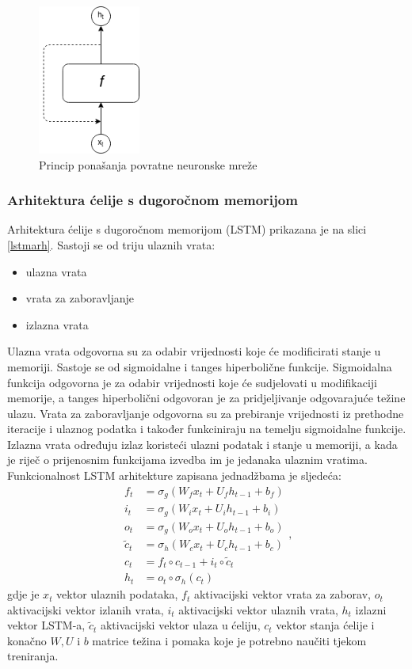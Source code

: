 \documentclass[times, utf8, zavrsni]{fer}
\begin{document}
\begin{figure}
	\centering
	\includegraphics[width=0.3\textwidth]{rnn}
	\caption{Princip ponašanja povratne neuronske mreže}
	\label{rnnprincip}
\end{figure}

\subsubsection{Arhitektura ćelije s dugoročnom memorijom}
Arhitektura ćelije s dugoročnom memorijom (\gls{LSTM}) prikazana je na slici \ref{lstmarh}. Sastoji se od triju ulaznih vrata:
\begin{itemize}
	\item ulazna vrata
	\item vrata za zaboravljanje
	\item izlazna vrata
\end{itemize}

Ulazna vrata odgovorna su za odabir vrijednosti koje će modificirati stanje u memoriji. Sastoje se od sigmoidalne i tanges hiperbolične funkcije. Sigmoidalna funkcija odgovorna je za odabir vrijednosti koje će sudjelovati u modifikaciji memorije, a tanges hiperbolični odgovoran je za pridjeljivanje odgovarajuće težine ulazu. Vrata za zaboravljanje odgovorna su za prebiranje vrijednosti iz prethodne iteracije i ulaznog podatka i također funkciniraju na temelju sigmoidalne funkcije. Izlazna vrata određuju izlaz koristeći ulazni podatak i stanje u memoriji, a kada je riječ o prijenosnim funkcijama izvedba im je jedanaka ulaznim vratima. Funkcionalnost \gls{LSTM} arhitekture zapisana jednadžbama je sljedeća: \[ \begin{aligned}
f_{t} &=\sigma_{g}\left(W_{f} x_{t}+U_{f} h_{t-1}+b_{f}\right) \\
i_{t} &=\sigma_{g}\left(W_{i} x_{t}+U_{i} h_{t-1}+b_{i}\right) \\
o_{t} &=\sigma_{g}\left(W_{o} x_{t}+U_{o} h_{t-1}+b_{o}\right) \\
\tilde{c}_{t} &=\sigma_{h}\left(W_{c} x_{t}+U_{c} h_{t-1}+b_{c}\right) \\
c_{t} &=f_{t} \circ c_{t-1}+i_{t} \circ \tilde{c}_{t} \\
h_{t} &=o_{t} \circ \sigma_{h}\left(c_{t}\right)
\end{aligned}, \]
gdje je $x_t$ vektor ulaznih podataka, $f_t$ aktivacijski vektor vrata za zaborav, $o_t$ aktivacijski vektor izlanih vrata, $i_t$ aktivacijski vektor ulaznih vrata, $h_t$ izlazni vektor \gls{LSTM}-a, $\tilde{c}_t$ aktivacijski vektor ulaza u ćeliju, $c_t$ vektor stanja ćelije i konačno $W, U$ i $b$ matrice težina i pomaka koje je potrebno naučiti tjekom treniranja.
\end{document}
